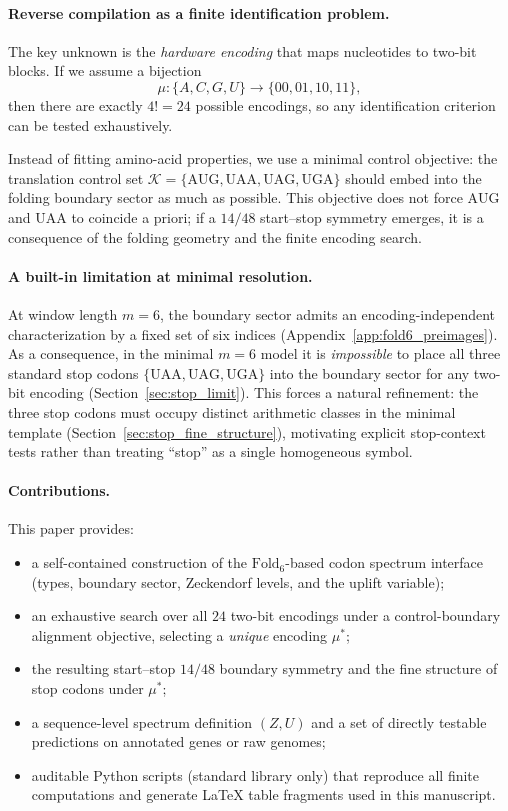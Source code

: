 \paragraph{Reverse compilation as a finite identification problem.}
The key unknown is the \emph{hardware encoding} that maps nucleotides to two-bit blocks.
If we assume a bijection
\[
\mu:\{A,C,G,U\}\to\{00,01,10,11\},
\]
then there are exactly $4!=24$ possible encodings, so any identification criterion can be tested exhaustively.

Instead of fitting amino-acid properties, we use a minimal control objective:
the translation control set $\mathcal{K}=\{\mathrm{AUG},\mathrm{UAA},\mathrm{UAG},\mathrm{UGA}\}$ should embed into the folding boundary sector as much as possible.
This objective does not force $\mathrm{AUG}$ and $\mathrm{UAA}$ to coincide a priori; if a $14/48$ start--stop symmetry emerges, it is a consequence of the folding geometry and the finite encoding search.

\paragraph{A built-in limitation at minimal resolution.}
At window length $m=6$, the boundary sector admits an encoding-independent characterization by a fixed set of six indices (Appendix~\ref{app:fold6_preimages}).
As a consequence, in the minimal $m=6$ model it is \emph{impossible} to place all three standard stop codons $\{\mathrm{UAA,UAG,UGA}\}$ into the boundary sector for any two-bit encoding (Section~\ref{sec:stop_limit}).
This forces a natural refinement: the three stop codons must occupy distinct arithmetic classes in the minimal template (Section~\ref{sec:stop_fine_structure}), motivating explicit stop-context tests rather than treating ``stop'' as a single homogeneous symbol.

\paragraph{Contributions.}
This paper provides:
\begin{itemize}
\item a self-contained construction of the $\mathrm{Fold}_6$-based codon spectrum interface (types, boundary sector, Zeckendorf levels, and the uplift variable);
\item an exhaustive search over all $24$ two-bit encodings under a control-boundary alignment objective, selecting a \emph{unique} encoding $\mu^\ast$;
\item the resulting start--stop $14/48$ boundary symmetry and the fine structure of stop codons under $\mu^\ast$;
\item a sequence-level spectrum definition $(Z,U)$ and a set of directly testable predictions on annotated genes or raw genomes;
\item auditable Python scripts (standard library only) that reproduce all finite computations and generate LaTeX table fragments used in this manuscript.
\end{itemize}


